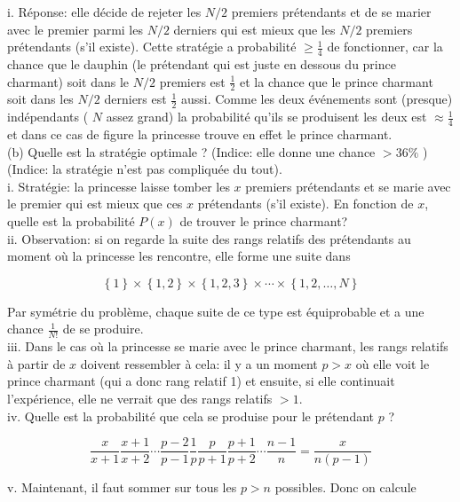 \begin{solution}
    i. Réponse: elle décide de rejeter les \( N / 2 \) premiers prétendants et de se marier avec le premier parmi les \( N / 2 \) derniers qui est mieux que les \( N / 2 \) premiers prétendants (s'il existe). Cette stratégie a probabilité \( \geq \frac{1}{4} \) de fonctionner, car la chance que le dauphin (le prétendant qui est juste en dessous du prince charmant) soit dans le \( N / 2 \) premiers est \( \frac{1}{2} \) et la chance que le prince charmant soit dans les \( N / 2 \) derniers est \( \frac{1}{2} \) aussi. Comme les deux événements sont (presque) indépendants ( \( N \) assez grand) la probabilité qu'ils se produisent les deux est \( \approx \frac{1}{4} \) et dans ce cas de figure la princesse trouve en effet le prince charmant.\\
    (b) Quelle est la stratégie optimale ? (Indice: elle donne une chance \( >36 \% \) ) (Indice: la stratégie n'est pas compliquée du tout).\\
    i. Stratégie: la princesse laisse tomber les \( x \) premiers prétendants et se marie avec le premier qui est mieux que ces \( x \) prétendants (s'il existe). En fonction de \( x \), quelle est la probabilité \( P\left(x\right) \) de trouver le prince charmant?\\
    ii. Observation: si on regarde la suite des rangs relatifs des prétendants au moment où la princesse les rencontre, elle forme une suite dans

    \[
        \left\{1\right\} \times\left\{1,2\right\} \times\left\{1,2,3\right\} \times \cdots \times\left\{1,2, \ldots, N\right\}
    \]

    Par symétrie du problème, chaque suite de ce type est équiprobable et a une chance \( \frac{1}{N!} \) de se produire.\\
    iii. Dans le cas où la princesse se marie avec le prince charmant, les rangs relatifs à partir de \( x \) doivent ressembler à cela: il y a un moment \( p>x \) où elle voit le prince charmant (qui a donc rang relatif 1) et ensuite, si elle continuait l'expérience, elle ne verrait que des rangs relatifs \( >1 \).\\
    iv. Quelle est la probabilité que cela se produise pour le prétendant \( p \) ?

    \[
        \frac{x}{x+1} \frac{x+1}{x+2} \cdots \frac{p-2}{p-1} \frac{1}{p} \frac{p}{p+1} \frac{p+1}{p+2} \cdots \frac{n-1}{n}=\frac{x}{n\left(p-1\right)}
    \]

    v. Maintenant, il faut sommer sur tous les \( p>n \) possibles. Donc on calcule


\end{solution}
